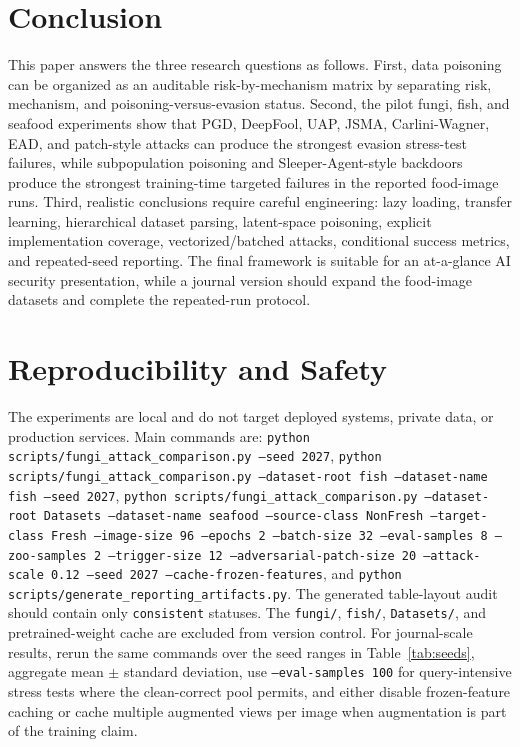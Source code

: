 \documentclass[conference]{IEEEtran}
\begin{document}
\section{Conclusion}

This paper answers the three research questions as follows. First, data poisoning can be organized as an auditable risk-by-mechanism matrix by separating risk, mechanism, and poisoning-versus-evasion status. Second, the pilot fungi, fish, and seafood experiments show that PGD, DeepFool, UAP, JSMA, Carlini-Wagner, EAD, and patch-style attacks can produce the strongest evasion stress-test failures, while subpopulation poisoning and Sleeper-Agent-style backdoors produce the strongest training-time targeted failures in the reported food-image runs. Third, realistic conclusions require careful engineering: lazy loading, transfer learning, hierarchical dataset parsing, latent-space poisoning, explicit implementation coverage, vectorized/batched attacks, conditional success metrics, and repeated-seed reporting. The final framework is suitable for an at-a-glance AI security presentation, while a journal version should expand the food-image datasets and complete the repeated-run protocol.

\section*{Reproducibility and Safety}

The experiments are local and do not target deployed systems, private data, or production services. Main commands are:
\texttt{python scripts/fungi\_attack\_comparison.py --seed 2027},
\texttt{python scripts/fungi\_attack\_comparison.py --dataset-root fish --dataset-name fish --seed 2027},
\texttt{python scripts/fungi\_attack\_comparison.py --dataset-root Datasets --dataset-name seafood --source-class NonFresh --target-class Fresh --image-size 96 --epochs 2 --batch-size 32 --eval-samples 8 --zoo-samples 2 --trigger-size 12 --adversarial-patch-size 20 --attack-scale 0.12 --seed 2027 --cache-frozen-features}, and
\texttt{python scripts/generate\_reporting\_artifacts.py}.
The generated table-layout audit should contain only \texttt{consistent} statuses. The \texttt{fungi/}, \texttt{fish/}, \texttt{Datasets/}, and pretrained-weight cache are excluded from version control. For journal-scale results, rerun the same commands over the seed ranges in Table~\ref{tab:seeds}, aggregate mean \(\pm\) standard deviation, use \texttt{--eval-samples 100} for query-intensive stress tests where the clean-correct pool permits, and either disable frozen-feature caching or cache multiple augmented views per image when augmentation is part of the training claim.
\end{document}
